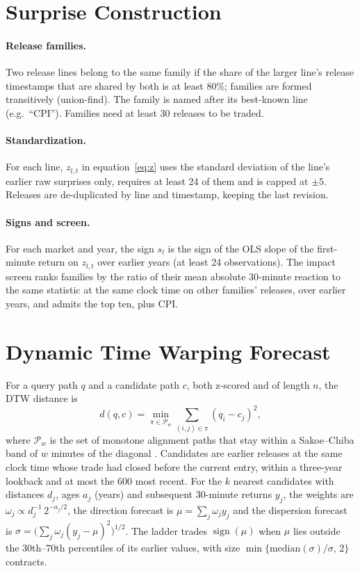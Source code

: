 \section{Surprise Construction}\label{app:surprise}

\paragraph{Release families.} Two release lines belong to the same family if the share of the
larger line's release timestamps that are shared by both is at least 80\%; families are formed
transitively (union-find). The family is named after its best-known line (e.g.\ ``CPI'').
Families need at least 30 releases to be traded.

\paragraph{Standardization.} For each line, $z_{l,t}$ in equation~\eqref{eq:z} uses the standard
deviation of the line's earlier raw surprises only, requires at least 24 of them and is capped at
$\pm5$. Releases are de-duplicated by line and timestamp, keeping the last revision.

\paragraph{Signs and screen.} For each market and year, the sign $s_l$ is the sign of the OLS
slope of the first-minute return on $z_{l,t}$ over earlier years (at least 24 observations). The
impact screen ranks families by the ratio of their mean absolute 30-minute reaction to the same
statistic at the same clock time on other families' releases, over earlier years, and admits the
top ten, plus CPI.

\section{Dynamic Time Warping Forecast}\label{app:dtw}

For a query path $q$ and a candidate path $c$, both z-scored and of length $n$, the DTW distance is
\[
  d(q,c) = \min_{\pi\in\mathcal{P}_w} \sum_{(i,j)\in\pi} (q_i - c_j)^2 ,
\]
where $\mathcal{P}_w$ is the set of monotone alignment paths that stay within a Sakoe--Chiba band
of $w$ minutes of the diagonal \citep{Sakoe1978}. Candidates are earlier releases at the same clock
time whose trade had closed before the current entry, within a three-year lookback and at most the
600 most recent. For the $k$ nearest candidates with distances $d_j$, ages $a_j$ (years) and
subsequent 30-minute returns $y_j$, the weights are $\omega_j \propto d_j^{-1}\,2^{-a_j/2}$, the
direction forecast is $\mu=\sum_j\omega_j y_j$ and the dispersion forecast is
$\sigma=\big(\sum_j\omega_j (y_j-\mu)^2\big)^{1/2}$. The ladder trades $\operatorname{sign}(\mu)$ when
$\mu$ lies outside the 30th--70th percentiles of its earlier values, with size
$\min\{\text{median}(\sigma)/\sigma,\,2\}$ contracts.
